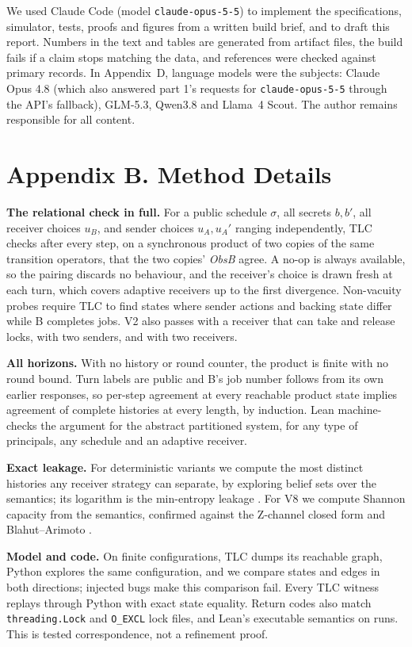 \documentclass[11pt,letterpaper]{article}
\newcommand{\code}[1]{{\small\texttt{#1}}}
\begin{document}
We used Claude Code (model \code{claude-opus-5-5}) to implement the specifications, simulator, tests, proofs and figures from a written build brief, and to draft this report. Numbers in the text and tables are generated from artifact files, the build fails if a claim stops matching the data, and references were checked against primary records. In Appendix~D, language models were the subjects: Claude Opus 4.8 (which also answered part 1's requests for \code{claude-opus-5-5} through the API's fallback), GLM-5.3, Qwen3.8 and Llama~4 Scout. The author remains responsible for all content.

\section{Appendix B. Method Details}

\textbf{The relational check in full.} For a public schedule $\sigma$, all secrets $b,b'$, all receiver choices $u_B$, and sender choices $u_A,u_A'$ ranging independently, TLC checks after every step, on a synchronous product of two copies of the same transition operators, that the two copies' \emph{ObsB} agree. A no-op is always available, so the pairing discards no behaviour, and the receiver's choice is drawn fresh at each turn, which covers adaptive receivers up to the first divergence. Non-vacuity probes require TLC to find states where sender actions and backing state differ while B completes jobs. V2 also passes with a receiver that can take and release locks, with two senders, and with two receivers.

\textbf{All horizons.} With no history or round counter, the product is finite with no round bound. Turn labels are public and B's job number follows from its own earlier responses, so per-step agreement at every reachable product state implies agreement of complete histories at every length, by induction. Lean machine-checks the argument for the abstract partitioned system, for any type of principals, any schedule and an adaptive receiver.

\textbf{Exact leakage.} For deterministic variants we compute the most distinct histories any receiver strategy can separate, by exploring belief sets over the semantics; its logarithm is the min-entropy leakage \cite{smith2009}. For V8 we compute Shannon capacity from the semantics, confirmed against the Z-channel closed form and Blahut--Arimoto \cite{blahut1972}.

\textbf{Model and code.} On \vCorrCases{} finite configurations, TLC dumps its reachable graph, Python explores the same configuration, and we compare \vCorrNodes{} states and \vCorrEdges{} edges in both directions; injected bugs make this comparison fail. Every TLC witness replays through Python with exact state equality. Return codes also match \code{threading.Lock} and \code{O\_EXCL} lock files, and Lean's executable semantics on \vLeanExportLines{} runs. This is tested correspondence, not a refinement proof.
\end{document}

